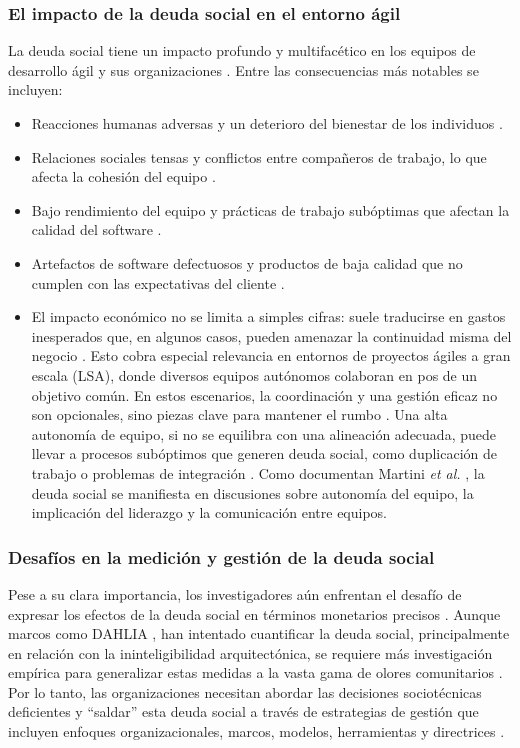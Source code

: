 \subsubsection{El impacto de la deuda social en el entorno ágil}
La deuda social tiene un impacto profundo y multifacético en los equipos de desarrollo ágil y sus organizaciones \cite{caballero2022communitysmells}. Entre las consecuencias más notables se incluyen:
\begin{itemize}
    \item Reacciones humanas adversas y un deterioro del bienestar de los individuos \cite{caballero2022communitysmells}.
    \item Relaciones sociales tensas y conflictos entre compañeros de trabajo, lo que afecta la cohesión del equipo \cite{caballero2022communitysmells}.
    \item Bajo rendimiento del equipo y prácticas de trabajo subóptimas que afectan la calidad del software \cite{caballero2022communitysmells}.
    \item Artefactos de software defectuosos y productos de baja calidad que no cumplen con las expectativas del cliente \cite{caballero2022communitysmells}.
    \item El impacto económico no se limita a simples cifras: suele traducirse en gastos inesperados que, en algunos casos, pueden amenazar la continuidad misma del negocio \cite{caballero2022communitysmells}. Esto cobra especial relevancia en entornos de proyectos ágiles a gran escala (LSA), donde diversos equipos autónomos colaboran en pos de un objetivo común. En estos escenarios, la coordinación y una gestión eficaz no son opcionales, sino piezas clave para mantener el rumbo \cite{martini2019agiledebt}. Una alta autonomía de equipo, si no se equilibra con una alineación adecuada, puede llevar a procesos subóptimos que generen deuda social, como duplicación de trabajo o problemas de integración \cite{martini2019agiledebt}. Como documentan Martini \textit{et al.} \cite{martini2019agiledebt}, la deuda social se manifiesta en discusiones sobre autonomía del equipo, la implicación del liderazgo y la comunicación entre equipos.
\end{itemize}

\subsubsection{Desafíos en la medición y gestión de la deuda social}
Pese a su clara importancia, los investigadores aún enfrentan el desafío de expresar los efectos de la deuda social en términos monetarios precisos \cite{caballero2022communitysmells}. Aunque marcos como DAHLIA \cite{caballero2022communitysmells}, \cite{tamburri2019software} han intentado cuantificar la deuda social, principalmente en relación con la ininteligibilidad arquitectónica, se requiere más investigación empírica para generalizar estas medidas a la vasta gama de olores comunitarios \cite{caballero2022communitysmells}. Por lo tanto, las organizaciones necesitan abordar las decisiones sociotécnicas deficientes y ``saldar'' esta deuda social a través de estrategias de gestión que incluyen enfoques organizacionales, marcos, modelos, herramientas y directrices \cite{caballero2022communitysmells}.


